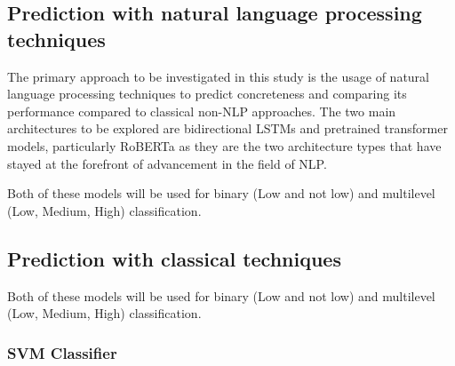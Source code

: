 \documentclass[12pt, a4paper]{article}
\begin{document}
\subsection{Prediction with natural language processing techniques}

The primary approach to be investigated in this study is the usage of natural language processing techniques to predict concreteness and comparing its performance compared to classical non-NLP approaches. The two main architectures to be explored are bidirectional LSTMs \cite{bilstm} and pretrained transformer models, particularly RoBERTa \cite{roberta} as they are the two architecture types that have stayed at the forefront of advancement in the field of NLP. 

Both of these models will be used for binary (Low and not low) and multilevel (Low, Medium, High) classification.

\subsection{Prediction with classical techniques}

Both of these models will be used for binary (Low and not low) and multilevel (Low, Medium, High) classification.


\subsubsection{SVM Classifier}
\end{document}
